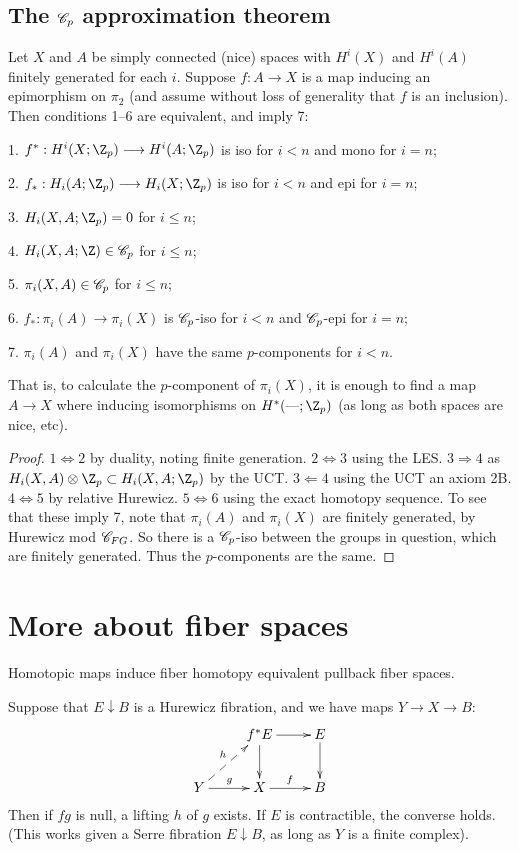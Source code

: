 \documentclass[11pt]{article}
\begin{document}
{\setcounter{subsection}{5}
\subsection{The \texorpdfstring{$\mathscr{C}_p$}{Cp} approximation theorem}
Let $X$ and $A$ be simply connected (nice) spaces with $H^i(X)$ and $H^i(A)$ finitely generated for each $i$. Suppose $f:A\to X$ is a map inducing an epimorphism on $\pi_2$ (and assume without loss of generality that $f$ is an inclusion). Then conditions 1--6 are equivalent, and imply 7:
\begin{itemise}
\item[1.] $f^*:H^i(X;\Z_p)\to H^i(A;\Z_p)$ is iso for $i<n$ and mono for $i=n$;
\item[2.] $f_*:H_i(A;\Z_p)\to H_i(X;\Z_p)$ is iso for $i<n$ and epi for $i=n$;
\item[3.] $H_i(X,A;\Z_p)=0$ for $i\leq n$;
\item[4.] $H_i(X,A;\Z)\in\scrC_p$ for $i\leq n$;
\item[5.] $\pi_i(X,A)\in\mathscr{C}_p$ for $i\leq n$;
\item[6.] $f_*:\pi_i(A)\to \pi_i(X)$ is $\mathscr{C}_p$-iso for $i<n$ and $\mathscr{C}_p$-epi for $i=n$;
\item[7.] $\pi_i(A)$ and $\pi_i(X)$ have the same $p$-components for $i<n$.
\end{itemise}
That is, to calculate the $p$-component of $\pi_i(X)$, it is enough to find a map $A\to X$ where inducing isomorphisms on $H^*(\DASH;\Z_p)$ (as long as both spaces are nice, etc).
\begin{proof}
$1\Leftrightarrow 2$ by duality, noting finite generation. $2\Leftrightarrow 3$ using the LES. $3\Rightarrow 4$ as $H_i(X,A)\otimes\Z_p\subset H_i(X,A;\Z_p)$ by the UCT. $3\Leftarrow 4$ using the UCT an axiom 2B. $4\Leftrightarrow 5$ by relative Hurewicz. $5\Leftrightarrow 6$ using the exact homotopy sequence. To see that these imply 7, note that $\pi_i(A)$ and $\pi_i(X)$ are finitely generated, by Hurewicz mod $\mathscr{C}_{FG}$. So there is a $\mathscr{C}_p$-iso between the groups in question, which are finitely generated. Thus the $p$-components are the same.
\end{proof}

\section{More about fiber spaces}
Homotopic maps induce fiber homotopy equivalent pullback fiber spaces.
\begin{prop*}
Suppose that $E\downarrow B$ is a Hurewicz fibration, and we have maps $Y\to X\to B$:
\[\xymatrix{
&f^*E\ar[r]\ar[d]&E\ar[d]\\
Y\ar[r]^g\ar@{-->}[ur]^h&X\ar[r]^f&B
}\]
Then if $fg$ is null, a lifting $h$ of $g$ exists. If $E$ is contractible, the converse holds. (This works given a Serre fibration $E\downarrow B$, as long as $Y$ is a finite complex).
\end{prop*}

}
\end{document}

